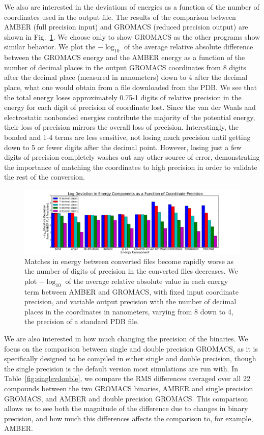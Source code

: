 We also are interested in the deviations of energies as a function of
the number of coordinates used in the output file. The results of the
comparison between AMBER (full precision input) and GROMACS (reduced
precision output) are shown in Fig.~\ref{fig:precision}.  We choose
only to show GROMACS as the other programs show similar behavior. We
plot the $-\log_{10}$ of the average relative absolute difference
between the GROMACS energy and the AMBER energy as a function of the
number of decimal places in the output GROMACS coordinates from 8
digits after the decimal place (measured in nanometers) down to 4
after the decimal place, what one would obtain from a file downloaded
from the PDB.  We see that the total energy loses approximately 0.75-1
digits of relative precision in the energy for each digit of precision
of coordinate lost. Since the van der Waals and electrostatic
nonbonded energies contribute the majority of the potential energy,
their loss of precision mirrors the overall loss of
precision. Interestingly, the bonded and 1-4 terms are less sensitive,
not losing much precision until getting down to 5 or fewer digits
after the decimal point.  However, losing just a few digits of
precision completely washes out any other source of error,
demonstrating the importance of matching the coordinates to high
precision in order to validate the rest of the conversion.

\begin{figure}[h]
\includegraphics[width=\textwidth]{precisioncomparison.pdf}   
\caption{Matches in energy between converted files become rapidly
  worse as the number of digits of precision in the converted files
  decreases. We plot $-\log_{10}$ of the average relative absolute
  value in each energy term between AMBER and GROMACS, with fixed
  input coordinate precision, and variable output precision with the
  number of decimal places in the coordinates in nanometers, varying
  from 8 down to 4, the precision of a standard PDB file.
\label{fig:precision}}
\end{figure}

We are also interested in how much changing the precision of the
binaries.  We focus on the comparison between single and double
precision GROMACS, as it is specifically designed to be compiled in
either single and double precision, though the single precision is the
default version most simulations are run with. In
Table~\ref{fig:singlevdouble}, we compare the RMS differences averaged
over all 22 compounds between the two GROMACS binaries, AMBER and
single precision GROMACS, and AMBER and double precision GROMACS.
This comparison allows us to see both the magnitude of the difference
due to changes in binary precision, and how much this differences
affects the comparison to, for example, AMBER.

